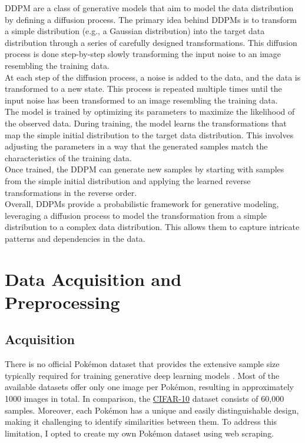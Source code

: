 \documentclass[12pt]{article}
\theoremstyle{plain}
\theoremstyle{definition}
\theoremstyle{remark}
\begin{document}
\ac{DDPM} are a class of generative models that aim to model the data distribution by defining a diffusion process. The primary idea behind \ac{DDPM}s is to transform a simple distribution (e.g., a Gaussian distribution) into the target data distribution through a series of carefully designed transformations. This diffusion process is done step-by-step slowly transforming the input noise to an image resembling the training data. \\
At each step of the diffusion process, a noise is added to the data, and the data is transformed to a new state. This process is repeated multiple times until the input noise has been transformed to an image resembling the training data. \\
The model is trained by optimizing its parameters to maximize the likelihood of the observed data. During training, the model learns the transformations that map the simple initial distribution to the target data distribution. This involves adjusting the parameters in a way that the generated samples match the characteristics of the training data.\\
Once trained, the DDPM can generate new samples by starting with samples from the simple initial distribution and applying the learned reverse transformations in the reverse order.\\

Overall, DDPMs provide a probabilistic framework for generative modeling, leveraging a diffusion process to model the transformation from a simple distribution to a complex data distribution. This allows them to capture intricate patterns and dependencies in the data.

\section{Data Acquisition and Preprocessing}
\label{sec:dataAca_and_preprocessing}
\subsection{Acquisition}
There is no official Pokémon dataset that provides the extensive sample size typically required for training generative deep learning models \citep{Yang2023}. Most of the available datasets offer only one image per Pokémon, resulting in approximately 1000 images in total. In comparison, the \href{https://www.cs.toronto.edu/~kriz/cifar.html}{\ac{CIFAR-10}} dataset consists of 60,000 samples. Moreover, each Pokémon has a unique and easily distinguishable design, making it challenging to identify similarities between them. To address this limitation, I opted to create my own Pokémon dataset using web scraping.
\end{document}
